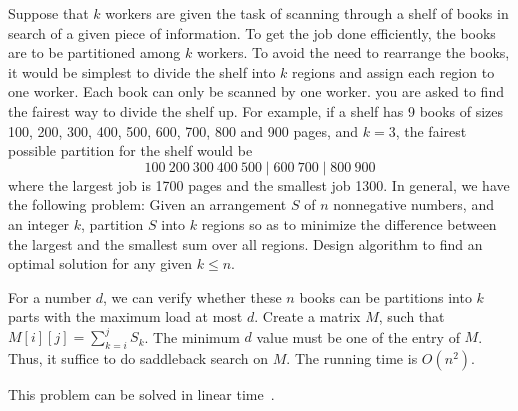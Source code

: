 \begin{Exercise}[origin={NCU CSIE 96}]
Suppose that $k$ workers are given the task of scanning through a shelf of books in search of a given piece of information. To get the job done efficiently, the books are to be partitioned among $k$ workers. To avoid the need to rearrange the books, it would be simplest to divide the shelf into $k$ regions and assign each region to one worker. Each book can only be scanned by one worker. you are asked to find the fairest way to divide the shelf up. For example, if a shelf has 9 books of sizes 100, 200, 300, 400, 500, 600, 700, 800 and 900 pages, and $k = 3$, the fairest possible partition for the shelf would be
\[ 100~200~300~400~500 \mid 600~700 \mid 800~900 \]
where the largest job is 1700 pages and the smallest job 1300. In general, we have the following problem: Given an arrangement $S$ of $n$ nonnegative numbers, and an integer $k$, partition $S$ into $k$ regions so as to minimize the difference between the largest and the smallest sum over all regions.
Design algorithm to find an optimal solution for any given $k \leq n$.
\end{Exercise}
\begin{Answer}
For a number $d$, we can verify whether these $n$ books can be partitions into $k$ parts with the maximum load at most $d$.
Create a matrix $M$, such that $M[i][j] = \sum_{k=i}^j S_k$.
The minimum $d$ value must be one of the entry of $M$.
Thus, it suffice to do saddleback search on $M$.
The running time is $O(n^2)$.
\begin{remark}
This problem can be solved in linear time~\cite{Frederickson1991}.
\end{remark}
%
\end{Answer}



